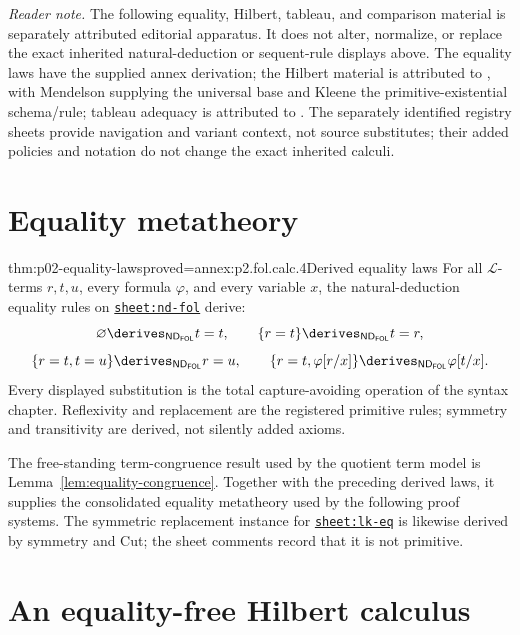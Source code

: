 \noindent\textit{Reader note.} The following equality, Hilbert, tableau, and
comparison material is separately attributed editorial apparatus.  It does
not alter, normalize, or replace the exact inherited natural-deduction or
sequent-rule displays above.  The equality laws have the supplied annex
derivation; the Hilbert material is attributed to
\cite{Mendelson1997,Kleene1952,Enderton2001}, with Mendelson supplying the
universal base and Kleene the primitive-existential schema/rule; tableau
adequacy is attributed to
\cite{Smullyan1968}.  The separately identified registry sheets provide
navigation and variant context, not source substitutes; their added policies
and notation do not change the exact inherited calculi.

\section{Equality metatheory}
\label{sec:p02-fol-equality-metatheory}

\begin{hbtheorem}{thm:p02-equality-laws}{proved=annex:p2.fol.calc.4}{Derived equality laws}
For all \(\mathcal L\)-terms \(r,t,u\), every formula \(\varphi\), and every
variable \(x\), the natural-deduction equality rules on
\hyperref[sheet:nd-fol]{\texttt{sheet:nd-fol}} derive:
\[
 \varnothing\derives_{\mathsf{ND}_{\mathsf{FOL}}}t=t,
 \qquad
 \{r=t\}\derives_{\mathsf{ND}_{\mathsf{FOL}}}t=r,
\]
\[
 \{r=t,t=u\}\derives_{\mathsf{ND}_{\mathsf{FOL}}}r=u,
 \qquad
 \{r=t,\varphi[r/x]\}
   \derives_{\mathsf{ND}_{\mathsf{FOL}}}\varphi[t/x].
\]
Every displayed substitution is the total capture-avoiding operation of the
syntax chapter.  Reflexivity and replacement are the registered primitive
rules; symmetry and transitivity are derived, not silently added axioms.
\end{hbtheorem}

The free-standing term-congruence result used by the quotient term model is
Lemma~\ref{lem:equality-congruence}.  Together with the preceding
derived laws, it supplies the consolidated equality metatheory used by the
following proof systems.  The symmetric replacement instance for
\hyperref[sheet:lk-eq]{\texttt{sheet:lk-eq}} is likewise derived by symmetry
and Cut; the sheet comments record that it is not primitive.

\section{An equality-free Hilbert calculus}
\label{sec:p02-hilbert-fol}

